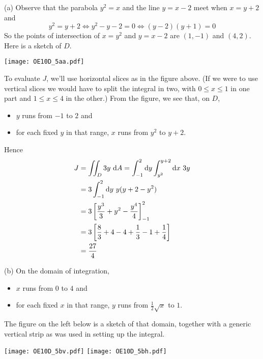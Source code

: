 \begin{solution}
(a) Observe that the parabola $y^2=x$ and the line $y=x-2$ meet
when $x=y+2$ and
\begin{equation*}
y^2=y+2
\iff y^2-y-2=0
\iff (y-2)(y+1)=0
\end{equation*}
So the points of intersection of $x=y^2$ and $y=x-2$ are $(1,-1)$
and $(4,2)$. Here is a sketch of $D$.

\begin{center}
     \texttt{[image: OE10D\_5aa.pdf]}
\end{center}

To evaluate $J$, we'll use horizontal slices as in the figure above.
(If we were to use vertical slices we would have to split the integral in two,
with $0\le x\le 1$ in one part and $1\le x\le 4$ in the other.)
From the figure, we see that, on $D$,
\begin{itemize}
\item
$y$ runs from $-1$ to $2$ and
\item 
for each fixed $y$ in that range, $x$ runs from $y^2$ to $y+2$.
\end{itemize}
Hence
\begin{align*}
J &=\iint_D 3y\ \mathrm{d}A
  =\int_{-1}^2\mathrm{d}y\int_{y^2}^{y+2}\mathrm{d}x\ 3y \\
  &=3\int_{-1}^2\mathrm{d}y\ y(y+2-y^2) \\
  &=3\left[\frac{y^3}{3}+y^2-\frac{y^4}{4}\right]_{-1}^2 \\
  &=3\left[\frac{8}{3}+4-4+\frac{1}{3}-1+\frac{1}{4}\right] \\
  &=\frac{27}{4}
\end{align*}

(b) 
On the domain of integration,
\begin{itemize}
\item
$x$ runs from $0$ to $4$ and
\item 
for each fixed $x$ in that range, $y$ runs from $\frac{1}{2}\sqrt{x}$ to $1$.
\end{itemize}
The figure on the left below is a sketch of that domain, together with 
a generic vertical strip as was used in setting up the integral.

\begin{center}
     \texttt{[image: OE10D\_5bv.pdf]}\qquad
     \texttt{[image: OE10D\_5bh.pdf]}\qquad
\end{center}


\end{solution}
